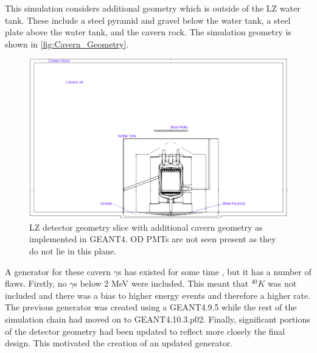 \par
This simulation considers additional geometry which is outside of the LZ water tank.
These include a steel pyramid and gravel below the water tank, a steel plate above the water tank, and the cavern rock.
The simulation geometry is shown in \autoref{fig:Cavern_Geometry}.

\begin{figure}
\includegraphics[width=\textwidth]{Figures/Geometry/cavern_geometry_with_markings.png}
\centering
\caption{LZ detector geometry slice with additional cavern geometry as implemented in GEANT4. OD PMTs are not seen present as they do not lie in this plane.}
\label{fig:Cavern_Geometry}
\end{figure}

\par
A generator for these cavern $\gamma$s has existed for some time \cite{rg_generator_ref}, but it has a number of flaws.
Firstly, no $\gamma$s below 2 MeV were included.
This meant that $^{40}K$ was not included and there was a bias to higher energy events and therefore a higher rate.
The previous generator was created using a GEANT4.9.5 while the rest of the simulation chain had moved on to GEANT4.10.3.p02. 
Finally, significant portions of the detector geometry had been updated to reflect more closely the final design. 
This motivated the creation of an updated generator.

